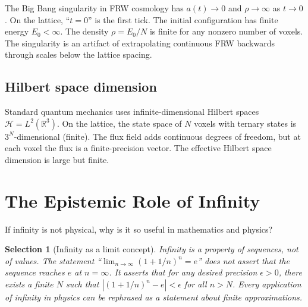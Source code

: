 \documentclass[11pt]{article}
\theoremstyle{tight}
\theoremstyle{plainroman}
\newtheorem{selection}[theorem]{Selection}
\newcommand{\R}{\mathbb{R}}
\begin{document}
The Big Bang singularity in FRW cosmology has $a(t)\to 0$ and $\rho\to\infty$ as $t\to 0$.
On the lattice, ``$t=0$'' is the first tick.
The initial configuration has finite energy $E_0<\infty$.
The density $\rho=E_0/N$ is finite for any nonzero number of voxels.
The singularity is an artifact of extrapolating continuous FRW backwards through scales below the lattice spacing.

\subsection{Hilbert space dimension}

Standard quantum mechanics uses infinite-dimensional Hilbert spaces $\mathcal H=L^2(\R^3)$.
On the lattice, the state space of $N$ voxels with ternary states is $3^N$-dimensional (finite).
The flux field adds continuous degrees of freedom, but at each voxel the flux is a finite-precision vector.
The effective Hilbert space dimension is large but finite.

\section{The Epistemic Role of Infinity}

If infinity is not physical, why is it so useful in mathematics and physics?

\begin{selection}[Infinity as a limit concept]
Infinity is a property of \emph{sequences}, not of \emph{values}.
The statement ``$\lim_{n\to\infty}(1+1/n)^n=e$'' does not assert that the sequence reaches $e$ at $n=\infty$.
It asserts that for any desired precision $\epsilon>0$, there exists a finite $N$ such that $|(1+1/n)^n-e|<\epsilon$ for all $n>N$.
Every application of infinity in physics can be rephrased as a statement about finite approximations.
\end{selection}
\end{document}
